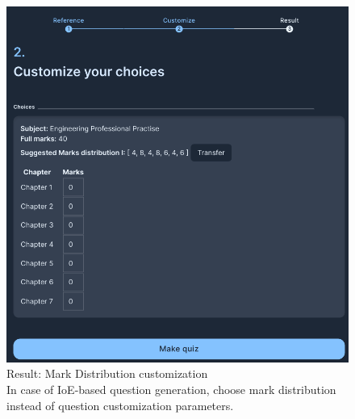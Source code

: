 \documentclass[12pt]{report}
\begin{document}
\pagebreak
\begin{figure}[ht!]
    \centering
    \includegraphics[scale = 0.4]{Images/MarkDistributionforSubjectwise.png}
    \captionsetup{justification=centering} 
    \caption{Result: Mark Distribution customization \\ In case of IoE-based question generation, choose mark distribution instead of question customization parameters.}
\end{figure}
\pagebreak
\end{document}
